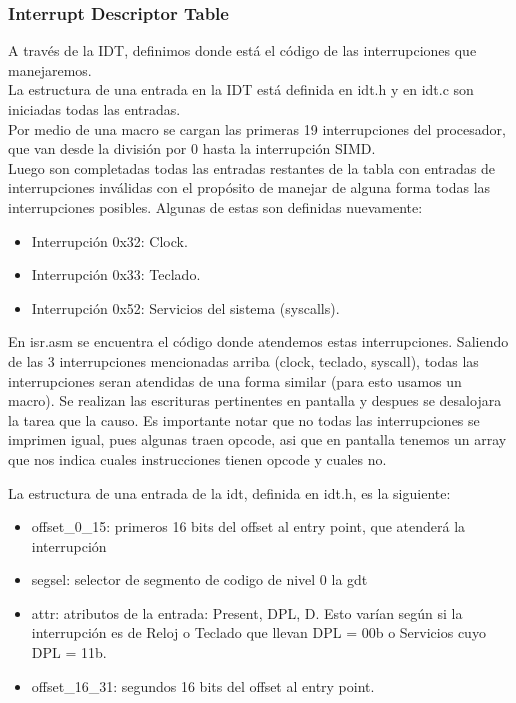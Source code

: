 \subsubsection{Interrupt Descriptor Table}
A trav\'es de la IDT, definimos donde est\'a el c\'odigo de las interrupciones que manejaremos.\\
La estructura de una entrada en la IDT est\'a definida en idt.h y en idt.c son iniciadas todas las entradas.\\
Por medio de una macro se cargan las primeras 19 interrupciones del procesador, que van desde la divisi\'on por 0 hasta la interrupci\'on SIMD.\\
Luego son completadas todas las entradas restantes de la tabla con entradas de interrupciones inv\'alidas con el prop\'osito de manejar 
de alguna forma todas las interrupciones posibles. Algunas de estas son definidas nuevamente:\\
\begin{itemize}
 \item Interrupci\'on 0x32: Clock.
 \item Interrupci\'on 0x33: Teclado.
 \item Interrupci\'on 0x52: Servicios del sistema (syscalls).
\end{itemize}

En isr.asm se encuentra el c\'odigo donde atendemos estas interrupciones. Saliendo de las 3 interrupciones mencionadas arriba (clock, teclado, syscall),
todas las interrupciones seran atendidas de una forma similar (para esto usamos un macro). Se realizan las escrituras pertinentes en pantalla y despues se desalojara la 
tarea que la causo. Es importante notar que no todas las interrupciones se imprimen igual, pues algunas traen opcode, asi que en pantalla tenemos un array que nos indica
cuales instrucciones tienen opcode y cuales no.

La estructura de una entrada de la idt, definida en idt.h, es la siguiente:\\
\begin{itemize}
 \item offset\_0\_15: primeros 16 bits del offset al entry point, que atender\'a la interrupci\'on
 \item segsel: selector de segmento de codigo de nivel 0 la gdt
 \item attr: atributos de la entrada: Present, DPL, D. Esto var\'ian seg\'un si la interrupci\'on es de Reloj o Teclado que llevan DPL = 00b
o Servicios cuyo DPL = 11b.
 \item offset\_16\_31: segundos 16 bits del offset al entry point.
\end{itemize}


